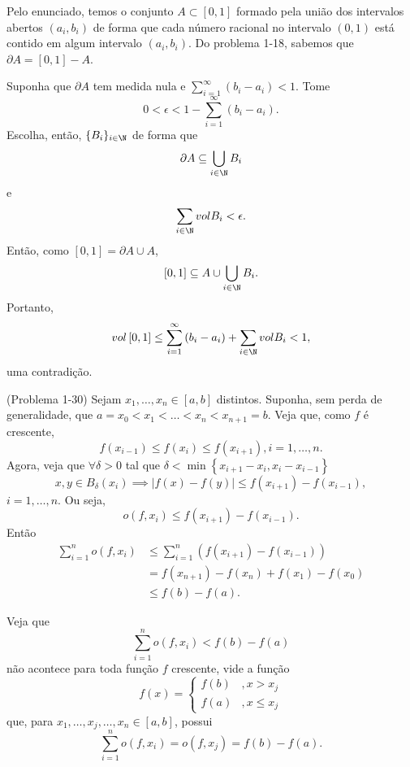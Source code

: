 \documentclass[a4paper]{report}
\begin{document}

Pelo enunciado, temos o conjunto $A\subset \left[ 0,1 \right] $ formado pela união dos intervalos abertos $\left( a_i, b_i \right) $ de forma que cada número racional no intervalo $\left( 0,1 \right)$ está contido em algum intervalo $\left( a_i, b_i \right) $. Do problema 1-18, sabemos que $\partial A = \left[ 0,1 \right] - A$.

Suponha que $\partial A$ tem medida nula e $\sum_{i=1}^{\infty} \left( b_i - a_i \right) < 1$. Tome \[
0<\epsilon < 1 - \sum_{i=1}^{\infty} \left( b_i - a_i \right)
.\] Escolha, então, $\{B_i\} _{i\in \N}$ de forma que \[
\partial A \subseteq \bigcup_{i\in \N} B_i
\] e \[
\sum_{i\in \N} vol B_i < \epsilon
.\] Então, como $\left[ 0,1 \right] = \partial A \cup A$, \[
\left[ 0,1 \right] \subseteq A \cup \bigcup_{i\in \N} B_i 
.\] Portanto, \[
vol \left[ 0,1 \right] \le \sum_{i=1}^{\infty} \left( b_i - a_i \right) + \sum_{i\in \N} vol B_i < 1
,\] uma contradição.


(Problema 1-30)
Sejam $x_1,\ldots,x_{n} \in \left[ a,b \right] $ distintos. Suponha, sem perda de generalidade, que $a=x_0<x_1<\ldots<x_n<x_{n+1}=b$. Veja que, como $f$ é crescente, \[
f\left( x_{i-1} \right) \le f\left( x_i \right) \le f\left( x_{i+1} \right) , i=1,\ldots,n
.\] Agora, veja que $\forall \delta>0$ tal que $\delta <\min \left\{ x_{i+1}-x_i, x_i - x_{i-1} \right\}$ \[
x,y\in B_\delta\left( x_i \right) \implies \left| f(x)-f(y) \right| \le  f\left( x_{i+1} \right) - f\left( x_{i-1} \right)
,\] $i=1,\ldots,n$. Ou seja, \[
o\left( f,x_i \right) \le f\left( x_{i+1} \right) -f\left( x_{i-1} \right) 
.\] Então 
\begin{align*}
    \sum_{i=1}^{n} o\left( f, x_i \right) &\le  \sum_{i=1}^{n} \left( f\left( x_{i+1} \right) - f\left( x_{i-1} \right)  \right) \\
					  &= f\left( x_{n+1} \right) - f\left( x_n \right) + f\left( x_1 \right)  - f\left( x_0 \right) \\
					  &\le  f\left( b \right) - f\left( a \right) \tag{*}
.\end{align*}

Veja que \[
\sum_{i=1}^{n} o\left( f,x_i \right) < f\left( b \right) -f\left( a \right) 
\] não acontece para toda função $f$ crescente, vide a função \[
f\left( x \right) = \begin{cases}
    f\left( b \right) &, x>x_j \\
    f\left( a \right) &, x\le x_j
\end{cases}
\] que, para $x_1,\ldots,x_j,\ldots,x_n \in \left[ a,b \right] $, possui \[
\sum_{i=1}^{n} o\left( f,x_i \right) = o\left( f, x_j \right) = f\left( b \right) - f\left( a \right) 
.\]
\end{document}
